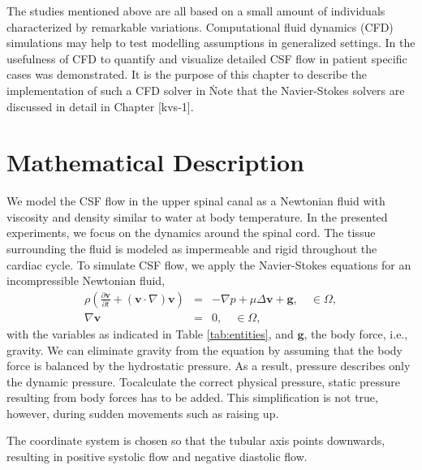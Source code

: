 The studies mentioned above are all based on a small amount of
individuals characterized by remarkable variations. Computational fluid dynamics (CFD) simulations
may help to test modelling assumptions in generalized
settings. In \cite{GuptaSoellingerBoesigerEtAl2009,Roldan2008} the
usefulness of CFD to quantify and visualize detailed CSF flow
in patient specific cases was demonstrated.
It is the purpose of this
chapter to describe the implementation of such a CFD solver in
\fenics\. Note that the Navier-Stokes solvers are discussed in
detail in Chapter [kvs-1].\\

\section{Mathematical Description}

We model the CSF flow in the upper spinal canal as a Newtonian fluid
 with viscosity and density similar to water
at body temperature. In the presented experiments, we focus on the
dynamics around the spinal cord. The tissue surrounding the fluid is
modeled as impermeable and rigid throughout the cardiac cycle. To
simulate CSF flow, we apply the Navier-Stokes 
equations for an incompressible Newtonian fluid,
\begin{eqnarray*}
\rho \left(\frac{\partial \mathbf{v}}{\partial t} + (\mathbf{v}\cdot\nabla) \mathbf{v}\right) &=& -\nabla p + \mu \Delta \mathbf{v} + \mathbf{g}, \quad \in \Omega, \\
\nabla \mathbf{v} &=& 0, \quad \in \Omega,
\end{eqnarray*}
with the variables as indicated in Table \ref{tab:entities}, and $\mathbf{g}$,
the body force, i.e., gravity. We can eliminate gravity from the
equation by assuming that the body force is balanced by the
hydrostatic pressure. As a result, pressure describes only the dynamic
pressure. Tocalculate the correct physical pressure, static
pressure resulting from body forces has to be added. This
simplification is not true, however, during sudden movements such as
raising up.

The coordinate system is chosen so that the tubular axis points downwards, resulting in positive systolic flow and negative diastolic flow.

